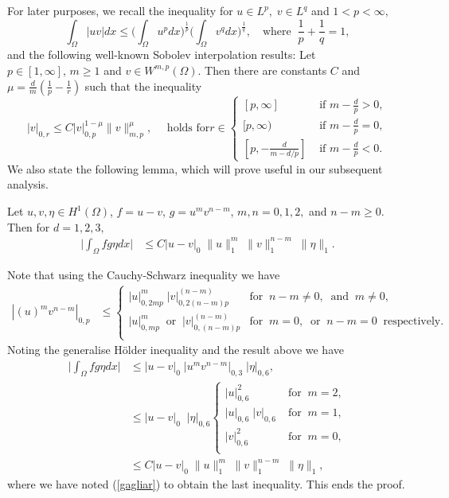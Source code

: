 For later purposes, we recall the \holder inequality for $u\in L^p,\; v\in L^q$
and $1<p<\infty,$
\begin{equation}
\int_\Omega |uv| dx \leq \bigg(\int_\Omega u^p dx\bigg)^{\frac{1}{p}}\bigg(
\int_\Omega v^q dx \bigg)^{\frac{1}{q}},\quad\mbox{where}\;\; \frac{1}{p}+\frac{1}{q}=1,\label{Holder}
\end{equation}
and the following well-known Sobolev
interpolation results: Let $p \in
[1,\infty],\, m \geq 1$ and $v \in W^{m,p}(\Omega)$.  Then
there are constants $C$ and $\mu=
\frac{d}{m}\left(\frac{1}{p}-\frac{1}{r}  \right )$ such that the
inequality
\begin{equation}
|v|_{0,r} \leq C|v|^{1-\mu}_{0,p} \|v\|^\mu_{m,p},\quad \mbox{ holds for
} 
r\in 
\begin{cases}
        \mbox{$[p,\infty]$}&  \mbox{ if }  m-\frac{d}{p} > 0,\\
        \mbox{$[p,\infty)$} &\mbox{ if } m-\frac{d}{p} = 0,\\
        \mbox{$[p,-\frac{d}{ m-d/p}]$}& \mbox{ if } m-\frac{d}{p} < 0.
\end{cases}\label{gagliar}
\end{equation}
We also state the following lemma, which will prove useful
in our subsequent analysis.

\begin{Lem}\label{Lem201}
Let $u,v,\eta \in H^1{(\Omega)}$, $f=u-v$, $g=u^m v^{n-m}$, $m,n=0,1,2,$ and $n-m\geq
0$. Then for $d=1,2,3,$
\begin{align}
\bigg| \int_\Omega f g \eta dx \bigg| &\leq C |u-v|_0\; \|u\|_1^m\; \|v\|_1^{n-m}\; \|\eta\|_1.
\label{2le000}
\end{align}
\end{Lem}
\bproof
Note that using the Cauchy-Schwarz inequality we have
\begin{align*}
|(u)^m v^{n-m}|_{0,p}&\leq
\begin{cases}
|u|_{0,2mp}^m \;|v|_{0,2(n-m)p}^{(n-m)}&\mbox{for}\;\;
 n-m\neq 0,\;\;\mbox{and}\;\; m\neq 0,\\
|u|_{0,mp}^m \;\;\mbox{or}\;\;|v|_{0,(n-m)p}^{(n-m)}&\mbox{for}\;\;
 m= 0,\;\;\mbox{or}\;\; n-m= 0\;\;\mbox{respectively}.\\
\end{cases}
\end{align*}
Noting the  generalise H\"older inequality  and the result above we have
\begin{align*}
\bigg| \int_\Omega f g \eta dx \bigg| 
&\leq |u-v|_0\;|u^m v^{n-m}|_{0,3}\;|\eta|_{0,6},\\
&\leq |u-v|_0\;\;|\eta|_{0,6}
\begin{cases}
|u|_{0,6}^2\;&\mbox{for}\;\;m=2,\\
|u|_{0,6}\;|v|_{0,6} \;&\mbox{for}\;\;m=1,\\
|v|_{0,6}^2 \;&\mbox{for}\;\;m=0,\\
\end{cases}\\
&\leq C |u-v|_0\; \|u\|_1^m\; \|v\|_1^{n-m}\; \|\eta\|_1,
\end{align*}
where we have noted (\ref{gagliar}) to obtain the last inequality.
This ends the proof.\eproof


